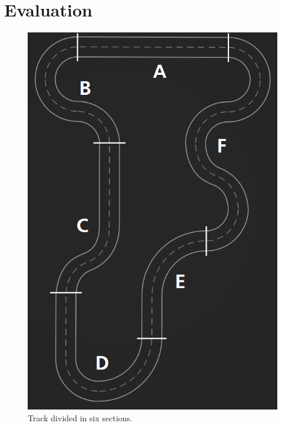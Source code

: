 
\section{Evaluation}\label{sec:evaluation}


\begin{figure}[!t]
\centering
\includegraphics[scale=0.3]{../plots/track}
\caption{Track divided in six sections.}
\label{track}
\end{figure}



